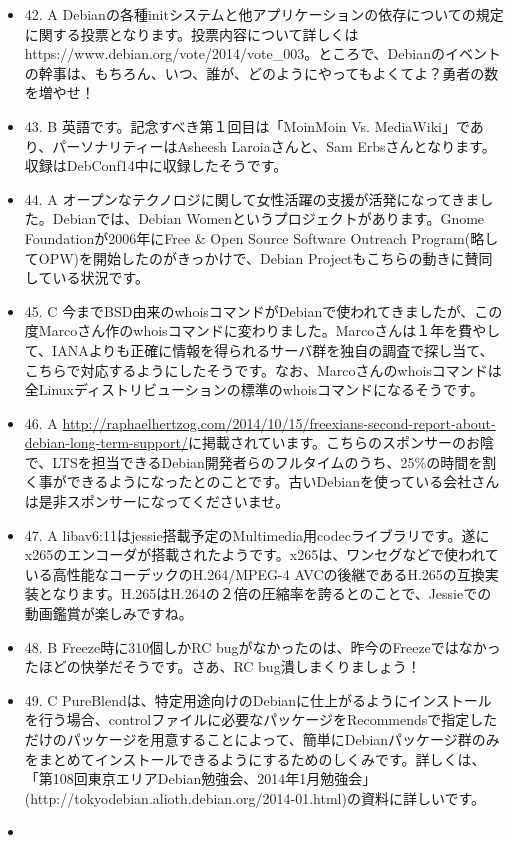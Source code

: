 \documentclass[mingoth,a4paper]{jsarticle}
\begin{document}
\begin{itemize}
\item
42. A Debianの各種initシステムと他アプリケーションの依存についての規定に関する投票となります。投票内容について詳しくはhttps://www.debian.org/vote/2014/vote\_003。ところで、Debianのイベントの幹事は、もちろん、いつ、誰が、どのようにやってもよくてよ？勇者の数を増やせ！
\item
43. B 英語です。記念すべき第１回目は「MoinMoin Vs. MediaWiki」であり、パーソナリティーはAsheesh Laroiaさんと、Sam Erbsさんとなります。収録はDebConf14中に収録したそうです。
\item
44. A オープンなテクノロジに関して女性活躍の支援が活発になってきました。Debianでは、Debian Womenというプロジェクトがあります。Gnome Foundationが2006年にFree \& Open Source Software Outreach Program(略してOPW)を開始したのがきっかけで、Debian Projectもこちらの動きに賛同している状況です。
\item
45. C 今までBSD由来のwhoisコマンドがDebianで使われてきましたが、この度Marcoさん作のwhoisコマンドに変わりました。Marcoさんは１年を費やして、IANAよりも正確に情報を得られるサーバ群を独自の調査で探し当て、こちらで対応するようにしたそうです。なお、Marcoさんのwhoisコマンドは全Linuxディストリビューションの標準のwhoisコマンドになるそうです。
\item
46. A {\footnotesize{\url{http://raphaelhertzog.com/2014/10/15/freexians-second-report-about-debian-long-term-support/}}}に掲載されています。こちらのスポンサーのお陰で、LTSを担当できるDebian開発者らのフルタイムのうち、25\%の時間を割く事ができるようになったとのことです。古いDebianを使っている会社さんは是非スポンサーになってくださいませ。
\item
47. A libav6:11はjessie搭載予定のMultimedia用codecライブラリです。遂にx265のエンコーダが搭載されたようです。x265は、ワンセグなどで使われている高性能なコーデックのH.264/MPEG-4 AVCの後継であるH.265の互換実装となります。H.265はH.264の２倍の圧縮率を誇るとのことで、Jessieでの動画鑑賞が楽しみですね。
\item
48. B Freeze時に310個しかRC bugがなかったのは、昨今のFreezeではなかったほどの快挙だそうです。さあ、RC bug潰しまくりましょう！
\item
49. C PureBlendは、特定用途向けのDebianに仕上がるようにインストールを行う場合、controlファイルに必要なパッケージをRecommendsで指定しただけのパッケージを用意することによって、簡単にDebianパッケージ群のみをまとめてインストールできるようにするためのしくみです。詳しくは、「第108回東京エリアDebian勉強会、2014年1月勉強会」(http://tokyodebian.alioth.debian.org/2014-01.html)の資料に詳しいです。
\item

\end{itemize}
\end{document}
